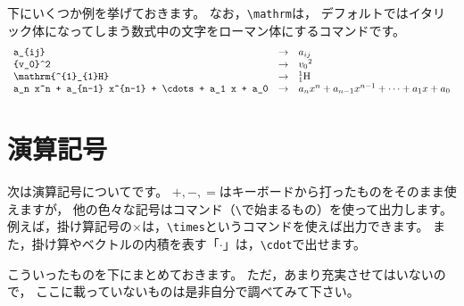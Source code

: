 下にいくつか例を挙げておきます。
なお，\verb|\mathrm|は，
デフォルトではイタリック体になってしまう数式中の文字をローマン体にするコマンドです。
\[ \begin{array}{lcl}
\verb|a_{ij}| & \rightarrow & a_{ij} \\
\verb|{v_0}^2| & \rightarrow & {v_0}^2 \\
\verb|\mathrm{^{1}_{1}H}| & \rightarrow & \mathrm{^{1}_{1}H} \\
\verb|a_n x^n + a_{n-1} x^{n-1} + \cdots + a_1 x + a_0| & \rightarrow & a_n x^n + a_{n-1} x^{n-1} + \cdots + a_1 x + a_0
\end{array} \]



\section{演算記号}
次は演算記号についてです。
$+, -, =$はキーボードから打ったものをそのまま使えますが，
他の色々な記号はコマンド（\verb|\|で始まるもの）を使って出力します。
例えば，掛け算記号の$\times$は，\verb|\times|というコマンドを使えば出力できます。
また，掛け算やベクトルの内積を表す「$\cdot$」は，\verb|\cdot|で出せます。

こういったものを下にまとめておきます。
ただ，あまり充実させてはいないので，
ここに載っていないものは是非自分で調べてみて下さい。

